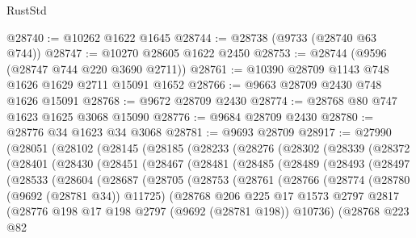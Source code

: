 \begin{lexlean}{RustStd}
\begin{coremodule}
{\begin{coremodule}
{{{{{{{{{{{{{{{{{{{{{{{{{{{{{{{{{{{{{{{{{{{{{{{{{{{{{{{@28740 := @10262 @1622 @1645
@28744 := @28738 (@9733 (@28740 @63 @744))
@28747 := @10270 @28605 @1622 @2450
@28753 := @28744 (@9596 (@28747 @744 @220 @3690 @2711))
@28761 := @10390 @28709 @1143 @748 @1626 @1629 @2711 @15091 @1652
@28766 := @9663 @28709 @2430 @748 @1626 @15091
@28768 := @9672 @28709 @2430
@28774 := @28768 @80 @747 @1623 @1625 @3068 @15090
@28776 := @9684 @28709 @2430
@28780 := @28776 @34 @1623 @34 @3068
@28781 := @9693 @28709
@28917 := @27990
    (@28051
      (@28102
        (@28145
          (@28185
            (@28233
              (@28276
                (@28302
                  (@28339
                    (@28372
                      (@28401
                        (@28430
                          (@28451
                            (@28467
                              (@28481
                                (@28485
                                  (@28489
                                    (@28493
                                      (@28497
                                        (@28533
                                          (@28604
                                            (@28687
                                              (@28705
                                                (@28753
                                                  (@28761
                                                    (@28766
                                                      (@28774
                                                        (@28780 (@9692 (@28781 @34)) @11725)
                                                        (@28768
                                                          @206
                                                          @225
                                                          @17
                                                          @1573
                                                          @2797
                                                          @2817
                                                          (@28776
                                                            @198
                                                            @17
                                                            @198
                                                            @2797
                                                            (@9692 (@28781 @198))
                                                            @10736)
                                                          (@28768
                                                            @223
                                                            @82
}}}}}}}}}}}}}}}}}}}}}}}}}}}}}}}}}}}}}}}}}}}}}}}}}}}}}}}
\end{coremodule}}
\end{coremodule}
\end{lexlean}
